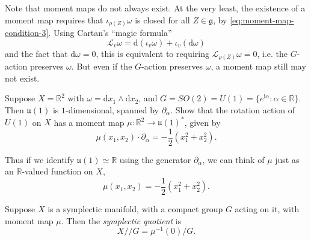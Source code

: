 \documentclass[12pt,letterpaper,reqno]{article}
\numberwithin{equation}{section}
\newcommand{\fg}{{\mathfrak g}}
\newcommand{\fu}{{\mathfrak u}}
\newcommand{\cL}{\ensuremath{\mathcal L}}
\newcommand{\R}{\ensuremath{\mathbb R}}
\newcommand{\half}{\ensuremath{\frac{1}{2}}}
\newcommand{\kq}{/\!\!/}
\newcommand{\I}{{\mathrm i}}
\newcommand{\de}{\mathrm{d}}
\newcommand{\ti}[1]{\textit{#1}}
\begin{document}
Note that moment maps do not always exist.
At the very least, the existence of a moment
map requires that $\iota_{\rho(Z)} \omega$ is closed
for all $Z \in \fg$, by \eqref{eq:moment-map-condition-3}. Using 
Cartan's ``magic formula''
\begin{equation} \label{eq:cartan-magic-formula}
  \cL_v \omega = \de (\iota_v \omega) + \iota_v (\de \omega)
\end{equation}
and the fact that $\de \omega = 0$,
this is equivalent to requiring $\cL_{\rho(Z)}\omega = 0$,
i.e. the $G$-action preserves $\omega$.
But even if the $G$-action preserves $\omega$,
a moment map still may not exist.

\begin{exercise}
Suppose $X = \R^2$ with $\omega = \de x_1 \wedge \de x_2$, and
$G = SO(2) = U(1) = \{e^{\I \alpha}: \alpha \in \R \}$.
Then $\fu(1)$ is $1$-dimensional, spanned by $\partial_\alpha$.
Show that the rotation action of $U(1)$ on $X$ 
has a moment map $\mu: \R^2 \to \fu(1)^*$, given by
\begin{equation}
  \mu(x_1,x_2) \cdot \partial_\alpha = -\half (x_1^2 + x_2^2).
\end{equation}
\end{exercise}
Thus if we identify $\fu(1) \simeq \R$ using the generator
$\partial_\alpha$, we can think of $\mu$ just as an $\R$-valued function
on $X$,
\begin{equation}
  \mu(x_1,x_2) = -\half (x_1^2 + x_2^2).
\end{equation}

\begin{defn}
Suppose $X$ is a symplectic manifold, with a compact group $G$
acting on it, with moment map $\mu$. Then the \ti{symplectic quotient}
is
\begin{equation}
  X \kq G = \mu^{-1}(0) / G.
\end{equation}
\end{defn}
\end{document}
